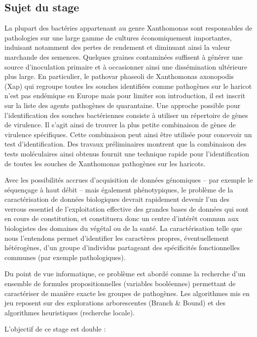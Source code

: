 \subsection*{Sujet du stage}
\par La plupart des bactéries appartenant au genre Xanthomonas sont responsables de pathologies sur
une large gamme de cultures économiquement importantes, induisant notamment des pertes
de rendement et diminuant ainsi la valeur marchande des semences. Quelques graines
contaminées suffisent à générer une source d'inoculation primaire et à occasionner ainsi une
dissémination ultérieure plus large. En particulier, le pathovar phaseoli de Xanthomonas axonopodis
(Xap) qui regroupe toutes les souches identifiées comme pathogènes sur le haricot n'est pas
endémique en Europe mais pour limiter son introduction, il est inscrit sur la liste des agents
pathogènes de quarantaine. Une approche possible pour l'identification des souches bactériennes
consiste à utiliser un répertoire de gènes de virulence. Il s'agit ainsi de trouver la plus petite
combinaison de gènes de virulence spécifiques. Cette combinaison peut ainsi être utilisée pour
concevoir un test d'identification. Des travaux préliminaires\cite{Chhel2013} montrent que la combinaison des
tests moléculaires ainsi obtenus fournit une technique rapide pour l'identification de toutes les
souches de Xanthomonas pathogènes sur les haricots.
\par Avec les possibilités accrues d'acquisition de données génomiques – par exemple le séquençage à
haut débit – mais également phénotypiques, le problème de la caractérisation de données
biologiques devrait rapidement devenir l'un des verrous essentiel de l'exploitation effective des
grandes bases de données qui sont en cours de constitution, et constituera donc un centre d'intérêt
commun aux biologistes des domaines du végétal ou de la santé. La caractérisation telle que nous
l'entendons permet d'identifier les caractères propres, éventuellement hétérogènes, d'un groupe
d’individus partageant des spécificités fonctionnelles communes (par exemple pathologiques).
\par Du point de vue informatique, ce problème est abordé comme la recherche d'un ensemble de
formules propositionnelles (variables booléennes) permettant de caractériser de manière exacte les
groupes de pathogènes. Les algorithmes mis en jeu reposent sur des explorations arborescentes
(Branch \& Bound) et des algorithmes heuristiques (recherche locale).
\par L'objectif de ce stage est double :
